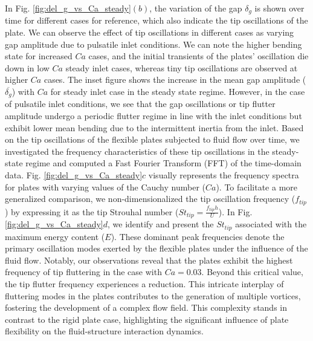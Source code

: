 \documentclass[%
aip,
amsmath,amssymb,
reprint,
]{revtex4-1}
\begin{document}
		In Fig. \ref{fig:del_g_vs_Ca_steady}$(b)$, the variation of the gap $\delta_g$ is shown over time for different cases for reference, which also indicate the tip oscillations of the plate. We can observe the effect of tip oscillations in different cases as varying gap amplitude due to pulsatile inlet conditions. We can note the higher bending state for increased $Ca$ cases, and the initial transients of the plates' oscillation die down in low $Ca$ steady inlet cases, whereas tiny tip oscillations are observed at higher $Ca$ cases. The inset figure shows the increase in the mean gap amplitude ($\overline{\delta_g}$) with $Ca$ for steady inlet case in the steady state regime. However, in the case of pulsatile inlet conditions, we see that the gap oscillations or tip flutter amplitude undergo a periodic flutter regime in line with the inlet conditions but exhibit lower mean bending due to the intermittent inertia from the inlet. Based on the tip oscillations of the flexible plates subjected to fluid flow over time, we investigated the frequency characteristics of these tip oscillations in the steady-state regime and computed a Fast Fourier Transform (FFT) of the time-domain data. Fig. \ref{fig:del_g_vs_Ca_steady}$c$ visually represents the frequency spectra for plates with varying values of the Cauchy number ($Ca$). To facilitate a more generalized comparison, we non-dimensionalized the tip oscillation frequency ($f_{tip}$) by expressing it as the tip Strouhal number ($St_{tip} = \frac{f_{tip}h}{U}$).
		In Fig. \ref{fig:del_g_vs_Ca_steady}$d$, we identify and present the $St_{tip}$ associated with the maximum energy content ($E$). These dominant peak frequencies denote the primary oscillation modes exerted by the flexible plates under the influence of the fluid flow. Notably, our observations reveal that the plates exhibit the highest frequency of tip fluttering in the case with $Ca=0.03$. Beyond this critical value, the tip flutter frequency experiences a reduction. This intricate interplay of fluttering modes in the plates contributes to the generation of multiple vortices, fostering the development of a complex flow field. This complexity stands in contrast to the rigid plate case, highlighting the significant influence of plate flexibility on the fluid-structure interaction dynamics.
		
\end{document}
